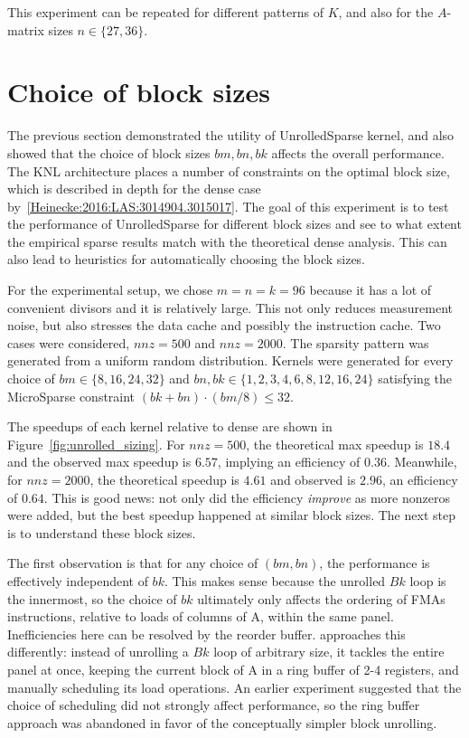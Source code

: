 This experiment can be repeated for different patterns of $K$, and also for the $A$-matrix sizes $n \in \{27, 36\}$. 


\section{Choice of block sizes}
\label{section:exp_unrolled_sizing}

The previous section demonstrated the utility of UnrolledSparse kernel, and also showed that the choice of block sizes $bm,bn,bk$ affects the overall performance. The KNL architecture places a number of constraints on the optimal block size, which is described in depth for the dense case by~\ref{Heinecke:2016:LAS:3014904.3015017}. The goal of this experiment is to test the performance of UnrolledSparse for different block sizes and see to what extent the empirical sparse results match with the theoretical dense analysis. This can also lead to heuristics for automatically choosing the block sizes.

For the experimental setup, we chose $m=n=k=96$ because it has a lot of convenient divisors and it is relatively large. This not only reduces measurement noise, but also stresses the data cache and possibly the instruction cache. Two cases were considered, $nnz=500$ and $nnz=2000$. The sparsity pattern was generated from a uniform random distribution. Kernels were generated for every choice of $bm \in \{8,16,24,32\}$ and $bn, bk \in \{1,2,3,4,6,8,12,16,24\}$ satisfying the MicroSparse constraint $(bk+bn) \cdot (bm/8) \leq 32$. 

The speedups of each kernel relative to dense are shown in Figure~\ref{fig:unrolled_sizing}. For $nnz=500$, the theoretical max speedup is $18.4$ and the observed max speedup is $6.57$, implying an efficiency of $0.36$. Meanwhile, for $nnz=2000$, the theoretical speedup is $4.61$ and observed is $2.96$, an efficiency of $0.64$. This is good news: not only did the efficiency \emph{improve} as more nonzeros were added, but the best speedup happened at similar block sizes. The next step is to understand these block sizes.

The first observation is that for any choice of $(bm, bn)$, the performance is effectively independent of $bk$. This makes sense because the unrolled $Bk$ loop is the innermost, so the choice of $bk$ ultimately only affects the ordering of \glspl{FMA} instructions, relative to loads of columns of A, within the same panel. Inefficiencies here can be resolved by the reorder buffer.  approaches this differently: instead of unrolling a $Bk$ loop of arbitrary size, it tackles the entire panel at once, keeping the current block of A in a ring buffer of 2-4 registers, and manually scheduling its load operations. An earlier experiment suggested that the choice of scheduling did not strongly affect performance, so the ring buffer approach was abandoned in favor of the conceptually simpler block unrolling.

